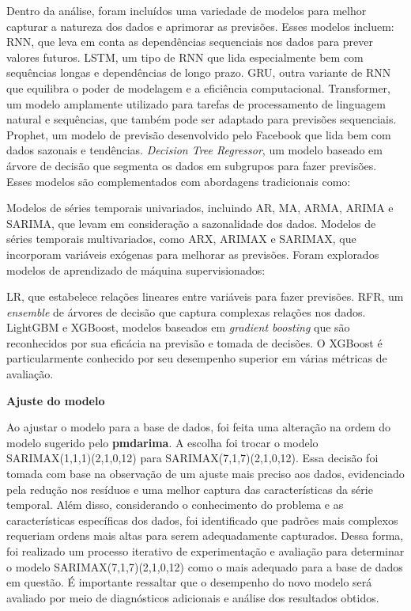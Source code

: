 Dentro da análise, foram incluídos uma variedade de modelos para melhor capturar a natureza dos dados e aprimorar as previsões. Esses modelos incluem:
RNN, que leva em conta as dependências sequenciais nos dados para prever valores futuros.
LSTM, um tipo de RNN que lida especialmente bem com sequências longas e dependências de longo prazo.
GRU, outra variante de RNN que equilibra o poder de modelagem e a eficiência computacional.
Transformer, um modelo amplamente utilizado para tarefas de processamento de linguagem natural e sequências, que também pode ser adaptado para previsões sequenciais.
Prophet, um modelo de previsão desenvolvido pelo Facebook que lida bem com dados sazonais e tendências.
\textit{Decision Tree Regressor}, um modelo baseado em árvore de decisão que segmenta os dados em subgrupos para fazer previsões.
Esses modelos são complementados com abordagens tradicionais como:

Modelos de séries temporais univariados, incluindo AR, MA, ARMA, ARIMA e SARIMA, que levam em consideração a sazonalidade dos dados.
Modelos de séries temporais multivariados, como ARX, ARIMAX e SARIMAX, que incorporam variáveis exógenas para melhorar as previsões.
Foram explorados modelos de aprendizado de máquina supervisionados:

LR, que estabelece relações lineares entre variáveis para fazer previsões.
RFR, um \textit{ensemble} de árvores de decisão que captura complexas relações nos dados.
LightGBM e XGBoost, modelos baseados em \textit{gradient boosting} que são reconhecidos por sua eficácia na previsão e tomada de decisões. O XGBoost é particularmente conhecido por seu desempenho superior em várias métricas de avaliação.



\noindent\textbf{Ajuste do modelo}


Ao ajustar o modelo para a base de dados, foi feita uma alteração na ordem do modelo sugerido pelo \textbf{pmdarima}. A escolha foi trocar o modelo SARIMAX(1,1,1)(2,1,0,12) para SARIMAX(7,1,7)(2,1,0,12). Essa decisão foi tomada com base na observação de um ajuste mais preciso aos dados, evidenciado pela redução nos resíduos e uma melhor captura das características da série temporal. Além disso, considerando o conhecimento do problema e as características específicas dos dados, foi identificado que padrões mais complexos requeriam ordens mais altas para serem adequadamente capturados. Dessa forma, foi realizado um processo iterativo de experimentação e avaliação para determinar o modelo SARIMAX(7,1,7)(2,1,0,12) como o mais adequado para a base de dados em questão. É importante ressaltar que o desempenho do novo modelo será avaliado por meio de diagnósticos adicionais e análise dos resultados obtidos.

